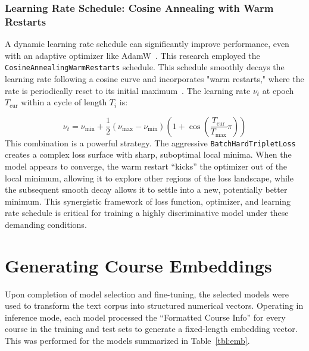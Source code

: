 \subsubsection{Learning Rate Schedule: Cosine Annealing with Warm Restarts}\label{ch:3.3.3.2}
A dynamic learning rate schedule can significantly improve performance, even with an adaptive optimizer like AdamW~\cite{loshchilov2019decoupledweightdecayregularization}. This research employed the \verb|CosineAnnealingWarmRestarts| schedule. This schedule smoothly decays the learning rate following a cosine curve and incorporates "warm restarts," where the rate is periodically reset to its initial maximum~\cite{pytorchcosanneal, loshchilovhutter}. The learning rate \(\nu_t\) at epoch \(T_{\textrm{cur}}\) within a cycle of length \(T_i\) is:{\setlength{\emergencystretch}{5em}\par}
\[ \nu_t = \nu_{\textrm{min}} + \frac{1}{2}\left( \nu_{\textrm{max}} -\nu_{\textrm{min}} \right)\left(1 + \cos\left(\frac{T_{\textrm{cur}}}{T_{\textrm{max}}}\pi\right)\right) \]
This combination is a powerful strategy. The aggressive \verb|BatchHardTripletLoss| creates a complex loss surface with sharp, suboptimal local minima. When the model appears to converge, the warm restart ``kicks'' the optimizer out of the local minimum, allowing it to explore other regions of the loss landscape, while the subsequent smooth decay allows it to settle into a new, potentially better minimum. This synergistic framework of loss function, optimizer, and learning rate schedule is critical for training a highly discriminative model under these demanding conditions.

\section{Generating Course Embeddings}\label{ch:3.4}
Upon completion of model selection and fine-tuning, the selected models were used to transform the text corpus into structured numerical vectors. Operating in inference mode, each model processed the ``Formatted Course Info'' for every course in the training and test sets to generate a fixed-length embedding vector. This was performed for the models summarized in Table~\ref{tbl:emb}.

